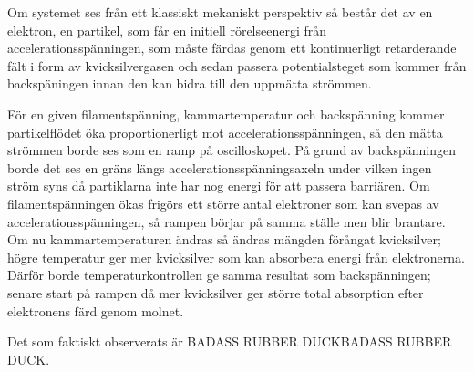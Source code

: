 Om systemet ses från ett klassiskt mekaniskt perspektiv så består det av en elektron, en partikel, som får en initiell rörelseenergi från accelerationsspänningen, som måste färdas genom ett kontinuerligt retarderande fält i form av kvicksilvergasen och sedan passera potentialsteget som kommer från backspäningen innan den kan bidra till den uppmätta strömmen. 

För en given filamentspänning, kammartemperatur och backspänning kommer partikelflödet öka proportionerligt mot accelerationsspänningen, så den mätta strömmen borde ses som en ramp på oscilloskopet. På grund av backspänningen borde det ses en gräns längs accelerationsspänningsaxeln under vilken ingen ström syns då partiklarna inte har nog energi för att passera barriären. Om filamentspänningen ökas frigörs ett större antal elektroner som kan svepas av accelerationsspänningen, så rampen börjar på samma ställe men blir brantare. Om nu kammartemperaturen ändras så ändras mängden förångat kvicksilver; högre temperatur ger mer kvicksilver som kan absorbera energi från elektronerna. Därför borde temperaturkontrollen ge samma resultat som backspänningen; senare start på rampen då mer kvicksilver ger större total absorption efter elektronens färd genom molnet. 

Det som faktiskt observerats är BADASS RUBBER DUCKBADASS RUBBER DUCK.
